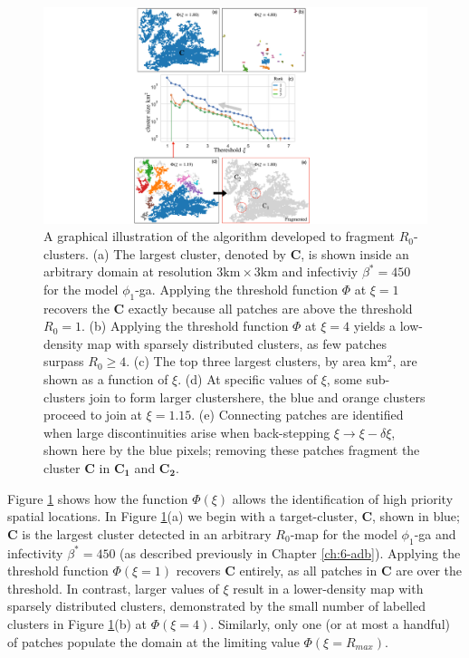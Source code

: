 \begin{figure}
    \centering
    \includegraphics[scale=0.5]{chapter7/figures/figure1-frag-method.pdf}
    \caption{
    A graphical illustration of the algorithm developed to fragment $R_0$-clusters.  
    (a) The largest cluster, denoted by $\mathbf{C}$, is shown inside an arbitrary domain at resolution $3\mathrm{km} \times 3 \mathrm{km}$ and infectiviy $\beta^*=450$ for the model $\phi_1$-ga.
    Applying the threshold function $\Phi$ at $\xi=1$ recovers the $\mathbf{C}$ exactly because all patches are above the threshold $R_0=1$.
    (b) Applying the threshold function $\Phi$ at $\xi=4$ yields a low-density map with sparsely distributed clusters, as few patches surpass $R_0\geq 4$. 
    (c) The top three largest clusters, by area $\mathrm{km^2}$, are shown as a function of $\xi$.
    (d) At specific values of $\xi$, some sub-clusters join to form larger clusters\textemdash here, the blue and orange clusters proceed to join at $\xi = 1.15$.
    (e) Connecting patches are identified when large discontinuities arise when back-stepping $\xi \rightarrow \xi -\delta \xi$, shown here by the blue pixels; removing these patches fragment the cluster $\mathbf{C}$ in $\mathbf{C_1}$ and $\mathbf{C_2}$. 
    }
    \label{fig:R0-threshold-function}
\end{figure}

Figure \ref{fig:R0-threshold-function} shows how the function $\Phi(\xi)$ allows the identification of high priority spatial locations.
In Figure \ref{fig:R0-threshold-function}(a) we begin with a target-cluster, $\mathbf{C}$, shown in blue;
$\mathbf{C}$ is the largest cluster detected in an arbitrary $R_0$-map for the model $\phi_1$-ga and infectivity $\beta^*=450$ (as described previously in Chapter \ref{ch:6-adb}).
Applying the threshold function $\Phi(\xi=1)$ recovers $\mathbf{C}$ entirely, as all patches in $\mathbf{C}$ are over the threshold.
In contrast, larger values of $\xi$ result in a lower-density map with sparsely distributed clusters, 
demonstrated by the small number of labelled clusters in Figure \ref{fig:R0-threshold-function}(b) at $\Phi(\xi=4)$.
Similarly, only one (or at most a handful) of patches populate the domain at the limiting value $\Phi(\xi=R_{max})$.

